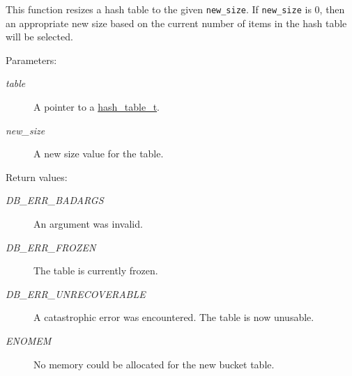 This function resizes a hash table to the given {\tt new\_\-size}. If {\tt new\_\-size} is 0, then an appropriate new size based on the current number of items in the hash table will be selected.\begin{Desc}
\item[Parameters: ]\par
\begin{description}
\item[{\em 
table}]A pointer to a \hyperlink{group__dbprim__hash_a0}{hash\_\-table\_\-t}. \item[{\em 
new\_\-size}]A new size value for the table.\end{description}
\end{Desc}
\begin{Desc}
\item[Return values: ]\par
\begin{description}
\item[{\em 
DB\_\-ERR\_\-BADARGS}]An argument was invalid. \item[{\em 
DB\_\-ERR\_\-FROZEN}]The table is currently frozen. \item[{\em 
DB\_\-ERR\_\-UNRECOVERABLE}]A catastrophic error was encountered. The table is now unusable. \item[{\em 
ENOMEM}]No memory could be allocated for the new bucket table. \end{description}
\end{Desc}
